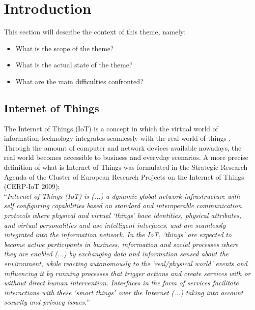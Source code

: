 \section{Introduction}
\label{sec:introduction}
This section will describe the context of this theme, namely:
\begin{itemize}
  \item What is the scope of the theme?
  \item What is the actual state of the theme?
  \item What are the main difficulties confronted?
\end{itemize}
\subsection{Internet of Things}
\label{sub:internet_of_things}
The Internet of Things (IoT) is a concept in which the virtual world of information technology integrates seamlessly
with the real world of things \cite{Uckelmann:2011:AIT:2018904}. Through the amount of computer and network devices
available nowadays, the real world becomes accessible to business and everyday scenarios. A more precise definition
of what is Internet of Things was formulated in the Strategic Research Agenda of the Cluster of European Research Projects
on the Internet of Things (CERP-IoT 2009):\\

``\textit{Internet of Things (IoT) is (...) a dynamic global network infrastructure with self configuring capabilities based on standard and interoperable
  communication protocols where physical and virtual `things' have identities, physical attributes, and virtual personalities and use intelligent interfaces,
  and are seamlessly integrated into the information network. In the IoT, `things' are expected to become active participants in business, information and social
  processes where they are enabled (...) by exchanging data and information  sensed about the environment, while reacting autonomously to the `real/physical world'
  events and influencing it by running processes that trigger actions and create services with or without direct human intervention. Interfaces in the form of services
  facilitate interactions with these `smart things' over the Internet (...) taking into account security and privacy issues.}''\\

